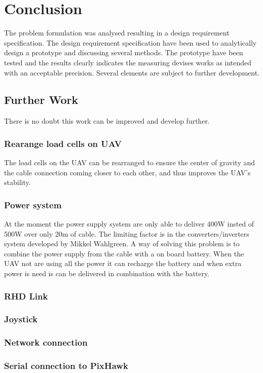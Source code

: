 \chapter{Conclusion}
The problem formulation was analysed resulting in a design requirement specification. The design requirement specification have been used to analytically design a prototype and discussing several methods. The prototype have been tested and the results clearly indicates the measuring devises works as intended with an acceptable precision.  Several elements are subject to further development.


\section{Further Work}
There is no doubt this work can be improved and develop further. 

\subsection*{Rearange load cells on UAV}
The load cells on the UAV can be rearranged to ensure the center of gravity and the cable connection coming closer to each other, and thus improves the UAV's stability.


\subsection*{Power system}
At the moment the power supply system are only able to deliver 400W insted of 500W over only 20m of cable. The limiting factor is in the converters/inverters system developed by Mikkel Wahlgreen. A way of solving this problem is to combine the power supply from the cable with a on board battery. When the UAV not are using all the power it can recharge the battery and when extra power is need is can be delivered in combination with the battery.

\subsection{RHD Link}

\subsection{Joystick}

\subsection{Network connection}

\subsection{Serial connection to PixHawk}